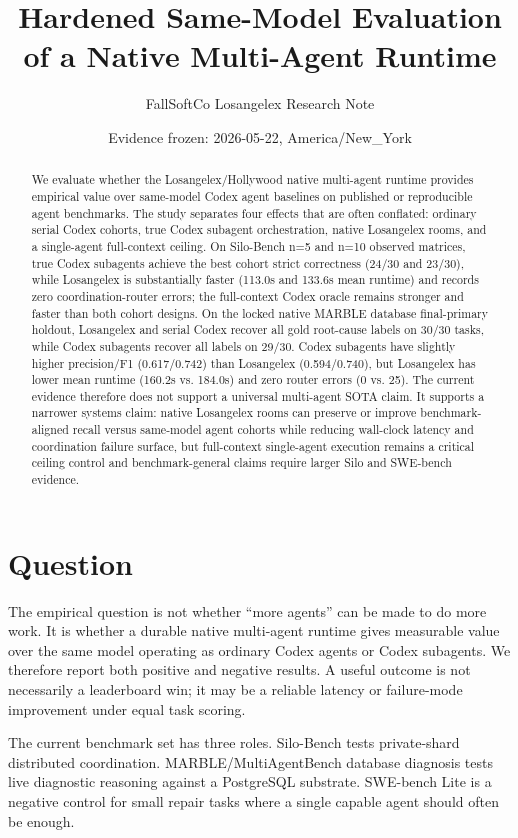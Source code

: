 \documentclass[10pt,twocolumn]{article}
\title{\vspace{-1em}Hardened Same-Model Evaluation of a Native Multi-Agent Runtime}
\author{FallSoftCo Losangelex Research Note}
\date{Evidence frozen: 2026-05-22, America/New\_York}
\begin{document}
\maketitle

\begin{abstract}
We evaluate whether the Losangelex/Hollywood native multi-agent runtime provides empirical value over same-model Codex agent baselines on published or reproducible agent benchmarks. The study separates four effects that are often conflated: ordinary serial Codex cohorts, true Codex subagent orchestration, native Losangelex rooms, and a single-agent full-context ceiling. On Silo-Bench n=5 and n=10 observed matrices, true Codex subagents achieve the best cohort strict correctness (24/30 and 23/30), while Losangelex is substantially faster (113.0s and 133.6s mean runtime) and records zero coordination-router errors; the full-context Codex oracle remains stronger and faster than both cohort designs. On the locked native MARBLE database final-primary holdout, Losangelex and serial Codex recover all gold root-cause labels on 30/30 tasks, while Codex subagents recover all labels on 29/30. Codex subagents have slightly higher precision/F1 (0.617/0.742) than Losangelex (0.594/0.740), but Losangelex has lower mean runtime (160.2s vs. 184.0s) and zero router errors (0 vs. 25). The current evidence therefore does not support a universal multi-agent SOTA claim. It supports a narrower systems claim: native Losangelex rooms can preserve or improve benchmark-aligned recall versus same-model agent cohorts while reducing wall-clock latency and coordination failure surface, but full-context single-agent execution remains a critical ceiling control and benchmark-general claims require larger Silo and SWE-bench evidence.
\end{abstract}

\section{Question}

The empirical question is not whether ``more agents'' can be made to do more work. It is whether a durable native multi-agent runtime gives measurable value over the same model operating as ordinary Codex agents or Codex subagents. We therefore report both positive and negative results. A useful outcome is not necessarily a leaderboard win; it may be a reliable latency or failure-mode improvement under equal task scoring.

The current benchmark set has three roles. Silo-Bench tests private-shard distributed coordination. MARBLE/MultiAgentBench database diagnosis tests live diagnostic reasoning against a PostgreSQL substrate. SWE-bench Lite is a negative control for small repair tasks where a single capable agent should often be enough.
\end{document}
